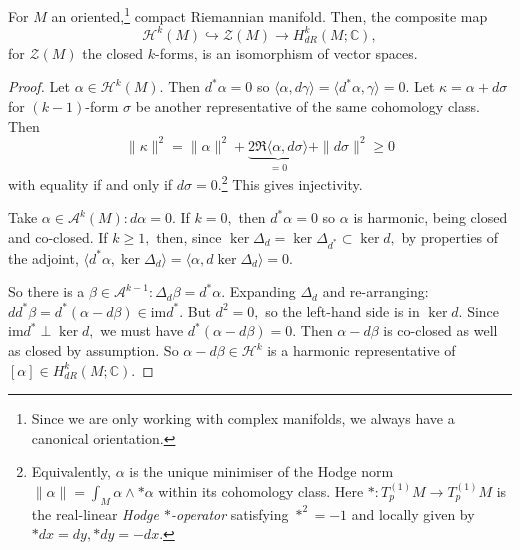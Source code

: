 \begin{theorem}
    For $M$ an oriented,\footnote{Since we are only working with complex manifolds, we always have a canonical orientation.} compact Riemannian manifold. Then, the composite map
    \[
    \mathcal{H}^k (M)\hookrightarrow \mathscr{Z}(M) \rightarrow H^k_{dR}(M; \mathbb{C}),
    \]
    for $\mathscr{Z}(M)$ the closed $k$-forms, is an isomorphism of vector spaces.
\end{theorem}
\begin{proof}
    Let $\alpha \in \mathcal{H}^k(M).$ Then $d^*\alpha = 0$ so $\langle \alpha, d\gamma\rangle = \langle d^*\alpha, \gamma\rangle = 0.$ Let $\kappa = \alpha + d\sigma$ for $(k-1)$-form $\sigma$ be another representative of the same cohomology class. Then
    \[
    \|\kappa\|^2 = \|\alpha\|^2 + \underbrace{2\Re\langle \alpha, d\sigma \rangle}_{=0} + \|d \sigma\|^2 \ge 0
    \]
    with equality if and only if $d\sigma = 0.$\footnote{Equivalently, $\alpha$ is the unique minimiser of the Hodge norm $\|\alpha\| = \int_M \alpha \wedge * \alpha$ within its cohomology class. Here $*:T_p^{(1)}M \to T_p^{(1)}M$ is the real-linear \textit{Hodge $*$-operator} satisfying $*^2 = -1$ and locally given by $*dx = dy, *dy = -dx.$} This gives injectivity.

    Take $\alpha \in \mathcal{A}^k(M):d\alpha = 0.$ If $k=0,$ then $d^*\alpha = 0$ so $\alpha$ is harmonic, being closed and co-closed. If $k\ge 1,$ then, since $\ker \Delta_d = \ker \Delta_{d^*} \subset \ker d,$ by properties of the adjoint, $\langle d^*\alpha, \ker \Delta_{d}\rangle = \langle \alpha, d\ker \Delta_d\rangle = 0.$

    So there is a $\beta \in \mathcal{A}^{k-1}:\Delta_d \beta = d^*\alpha.$ Expanding $\Delta_d$ and re-arranging: $dd^*\beta =d^*(\alpha - d\beta) \in \mathrm{im } d^*.$ But $d^2 = 0,$ so the left-hand side is in $\ker d.$ Since $ \mathrm{im } d^* \perp \ker d,$ we must have $d^*(\alpha - d\beta) = 0.$ Then $\alpha - d\beta$ is co-closed as well as closed by assumption. So $\alpha - d\beta \in \mathcal{H}^k$ is a harmonic representative of $[\alpha] \in H^k_{dR}(M; \mathbb{C}).$
\end{proof}

